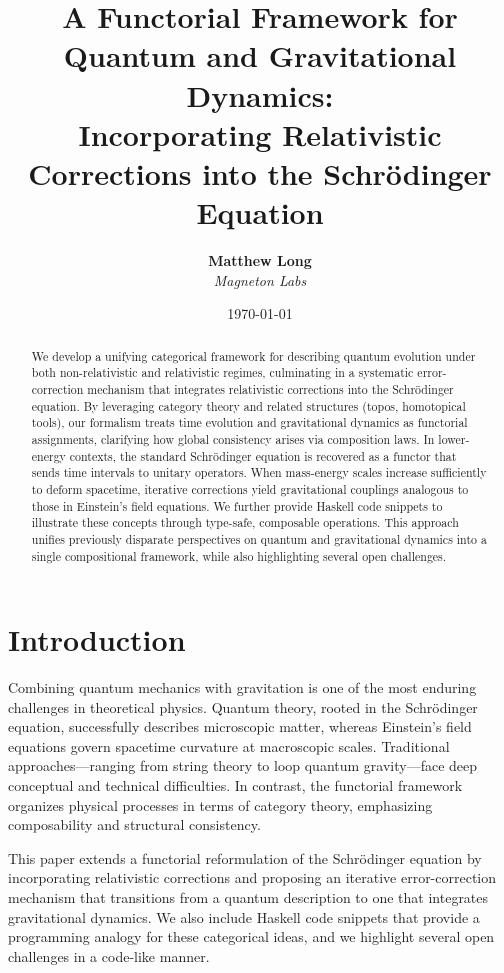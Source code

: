 \documentclass[12pt]{article}
\title{\textbf{A Functorial Framework for Quantum and Gravitational Dynamics: \\ 
Incorporating Relativistic Corrections into the Schrödinger Equation}}
\author{
  \textbf{Matthew Long} \\
  \emph{Magneton Labs}
}
\date{\today}
\begin{document}
\maketitle

\begin{abstract}
We develop a unifying categorical framework for describing quantum evolution under both non-relativistic and relativistic regimes, culminating in a systematic error-correction mechanism that integrates relativistic corrections into the Schrödinger equation. By leveraging category theory and related structures (topos, homotopical tools), our formalism treats time evolution and gravitational dynamics as functorial assignments, clarifying how global consistency arises via composition laws. In lower-energy contexts, the standard Schrödinger equation is recovered as a functor that sends time intervals to unitary operators. When mass-energy scales increase sufficiently to deform spacetime, iterative corrections yield gravitational couplings analogous to those in Einstein's field equations. We further provide Haskell code snippets to illustrate these concepts through type-safe, composable operations. This approach unifies previously disparate perspectives on quantum and gravitational dynamics into a single compositional framework, while also highlighting several open challenges.
\end{abstract}

\tableofcontents

\section{Introduction}
Combining quantum mechanics with gravitation is one of the most enduring challenges in theoretical physics. Quantum theory, rooted in the Schrödinger equation, successfully describes microscopic matter, whereas Einstein's field equations govern spacetime curvature at macroscopic scales. Traditional approaches—ranging from string theory to loop quantum gravity—face deep conceptual and technical difficulties. In contrast, the functorial framework organizes physical processes in terms of category theory, emphasizing composability and structural consistency.

This paper extends a functorial reformulation of the Schrödinger equation by incorporating relativistic corrections and proposing an iterative error-correction mechanism that transitions from a quantum description to one that integrates gravitational dynamics. We also include Haskell code snippets that provide a programming analogy for these categorical ideas, and we highlight several open challenges in a code-like manner.
\end{document}
